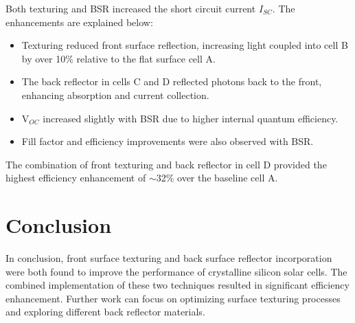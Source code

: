 \documentclass[]{report}
\begin{document}
Both texturing and BSR increased the short circuit current $I_{SC}$. The enhancements are explained below:

\begin{itemize}
\item Texturing reduced front surface reflection, increasing light coupled into cell B by over 10\% relative to the flat surface cell A.
\item The back reflector in cells C and D reflected photons back to the front, enhancing absorption and current collection.
\item V$_{OC}$ increased slightly with BSR due to higher internal quantum efficiency.
\item Fill factor and efficiency improvements were also observed with BSR.
\end{itemize}

The combination of front texturing and back reflector in cell D provided the highest efficiency enhancement of $\sim$32\% over the baseline cell A.

\section{Conclusion}
In conclusion, front surface texturing and back surface reflector incorporation were both found to improve the performance of crystalline silicon solar cells. The combined implementation of these two techniques resulted in significant efficiency enhancement. Further work can focus on optimizing surface texturing processes and exploring different back reflector materials.
\end{document}
